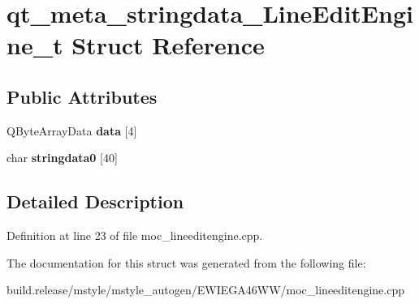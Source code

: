 \hypertarget{structqt__meta__stringdata___line_edit_engine__t}{}\section{qt\+\_\+meta\+\_\+stringdata\+\_\+\+Line\+Edit\+Engine\+\_\+t Struct Reference}
\label{structqt__meta__stringdata___line_edit_engine__t}
\subsection*{Public Attributes}
\begin{DoxyCompactItemize}
\item 
\mbox{\label{structqt__meta__stringdata___line_edit_engine__t_a4201a26a2acb75ffee37d6d1f7966587}} 
Q\+Byte\+Array\+Data {\bfseries data} \mbox{[}4\mbox{]}
\item 
\mbox{\label{structqt__meta__stringdata___line_edit_engine__t_a474e49a0caa0a432d2aa958db95847a5}} 
char {\bfseries stringdata0} \mbox{[}40\mbox{]}
\end{DoxyCompactItemize}


\subsection{Detailed Description}


Definition at line 23 of file moc\+\_\+lineeditengine.\+cpp.



The documentation for this struct was generated from the following file\+:\begin{DoxyCompactItemize}
\item 
build.\+release/mstyle/mstyle\+\_\+autogen/\+E\+W\+I\+E\+G\+A46\+W\+W/moc\+\_\+lineeditengine.\+cpp\end{DoxyCompactItemize}
